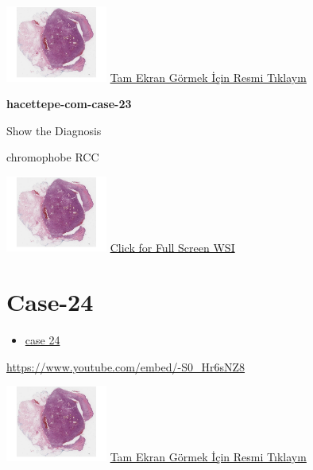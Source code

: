 \documentclass[
  letterpaper,
  paper=6in:9in,
  pagesize=pdftex,
  headinclude=on,
  footinclude=on,
  12pt]{scrbook}
\providecommand{\tightlist}{%
  \setlength{\itemsep}{0pt}\setlength{\parskip}{0pt}}\usepackage{longtable,booktabs,array}
\begin{document}
\href{https://images.patolojiatlasi.com/hacettepe-com-case-1/HE.html}{\includegraphics[width=0.25\textwidth,height=\textheight]{./screenshots/hacettepe-com-case-1_screenshot.png}}
\href{https://images.patolojiatlasi.com/hacettepe-com-case-23/HE.html}{Tam
Ekran Görmek İçin Resmi Tıklayın}

\textbf{hacettepe-com-case-23}

Show the Diagnosis

\hypertarget{answer23}{}
chromophobe RCC

\href{https://images.patolojiatlasi.com/hacettepe-com-case-1/HE.html}{\includegraphics[width=0.25\textwidth,height=\textheight]{./screenshots/hacettepe-com-case-1_screenshot.png}}
\href{https://images.patolojiatlasi.com/hacettepe-com-case-23/HE.html}{Click
for Full Screen WSI}

\hypertarget{sec-hacettepe-case-of-the-month-case-24}{%
\section{Case-24}\label{sec-hacettepe-case-of-the-month-case-24}}

\begin{itemize}
\tightlist
\item
  \href{https://www.youtube.com/watch?v=-S0_Hr6sNZ8\&ab_channel=KemalKosemehmetoglu}{case
  24}
\end{itemize}

\url{https://www.youtube.com/embed/-S0_Hr6sNZ8}

\href{https://images.patolojiatlasi.com/hacettepe-com-case-1/HE.html}{\includegraphics[width=0.25\textwidth,height=\textheight]{./screenshots/hacettepe-com-case-1_screenshot.png}}
\href{https://images.patolojiatlasi.com/hacettepe-com-case-24/HE.html}{Tam
Ekran Görmek İçin Resmi Tıklayın}
\end{document}
